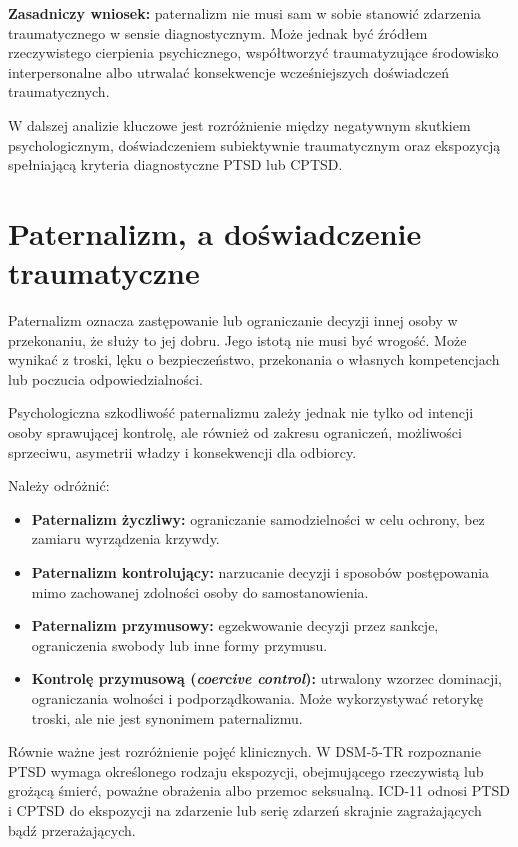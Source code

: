 \documentclass[11pt,a4paper,oneside,headinclude=true,footinclude=false]{scrartcl}
\providecommand{\tightlist}{\setlength{\itemsep}{3pt}\setlength{\parskip}{0pt}}
\begin{document}
\begin{keyfinding}
\textbf{Zasadniczy wniosek:} paternalizm nie musi sam w sobie stanowić
zdarzenia traumatycznego w sensie diagnostycznym. Może jednak być
źródłem rzeczywistego cierpienia psychicznego, współtworzyć
traumatyzujące środowisko interpersonalne albo utrwalać konsekwencje
wcześniejszych doświadczeń traumatycznych.
\end{keyfinding}

W dalszej analizie kluczowe jest rozróżnienie między negatywnym skutkiem
psychologicznym, doświadczeniem subiektywnie traumatycznym oraz
ekspozycją spełniającą kryteria diagnostyczne PTSD lub CPTSD.

\section{Paternalizm, a doświadczenie traumatyczne}\label{sec:2}

Paternalizm oznacza zastępowanie lub ograniczanie decyzji innej osoby w
przekonaniu, że służy to jej dobru. Jego istotą nie musi być wrogość.
Może wynikać z troski, lęku o bezpieczeństwo, przekonania o własnych
kompetencjach lub poczucia odpowiedzialności.

Psychologiczna szkodliwość paternalizmu zależy jednak nie tylko od
intencji osoby sprawującej kontrolę, ale również od zakresu ograniczeń,
możliwości sprzeciwu, asymetrii władzy i konsekwencji dla odbiorcy.

Należy odróżnić:

\begin{itemize}
\tightlist
\item
  \textbf{Paternalizm życzliwy:} ograniczanie samodzielności w celu
  ochrony, bez zamiaru wyrządzenia krzywdy.
\item
  \textbf{Paternalizm kontrolujący:} narzucanie decyzji i sposobów
  postępowania mimo zachowanej zdolności osoby do samostanowienia.
\item
  \textbf{Paternalizm przymusowy:} egzekwowanie decyzji przez sankcje,
  ograniczenia swobody lub inne formy przymusu.
\item
  \textbf{Kontrolę przymusową (\emph{coercive control}):} utrwalony
  wzorzec dominacji, ograniczania wolności i podporządkowania. Może
  wykorzystywać retorykę troski, ale nie jest synonimem paternalizmu.
\end{itemize}

Równie ważne jest rozróżnienie pojęć klinicznych. W DSM-5-TR rozpoznanie
PTSD wymaga określonego rodzaju ekspozycji, obejmującego rzeczywistą lub
grożącą śmierć, poważne obrażenia albo przemoc seksualną. ICD-11 odnosi
PTSD i CPTSD do ekspozycji na zdarzenie lub serię zdarzeń skrajnie
zagrażających bądź przerażających.
\end{document}
